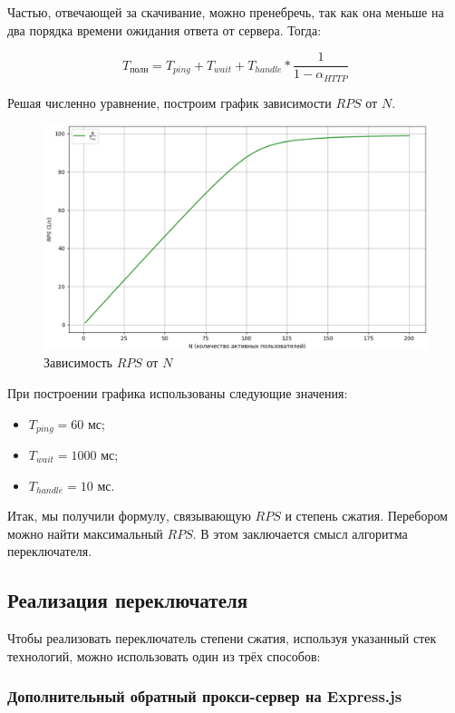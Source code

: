 \documentclass[12pt]{article}
\begin{document}
Частью, отвечающей за скачивание, можно пренебречь, так как она меньше на два порядка времени ожидания ответа от сервера. Тогда:

\[
    T_{\text{полн}} = T_{ping} + T_{wait} + T_{handle}*\frac{1}{1 - \alpha_{HTTP}}
\]

Решая численно уравнение, построим график зависимости $RPS$ от $N$.

\begin{figure}[H]
    \centering
    \includegraphics[width=1\textwidth]{../images/rps-from-n.png}
    \caption{Зависимость $RPS$ от $N$}
\end{figure}

При построении графика использованы следующие значения:

\begin{itemize}
    \item $T_{ping} = 60 \text{ мс}$;
    \item $T_{wait} = 1000 \text{ мс}$;
    \item $T_{handle} = 10 \text{ мс}$.
\end{itemize}

Итак, мы получили формулу, связывающую $RPS$ и степень сжатия. Перебором можно найти максимальный $RPS$. В этом заключается смысл алгоритма переключателя.

\subsection{Реализация переключателя}

Чтобы реализовать переключатель степени сжатия, используя указанный стек технологий, можно использовать один из трёх способов:

\subsubsection{Дополнительный обратный прокси-сервер на Express.js}
\end{document}
